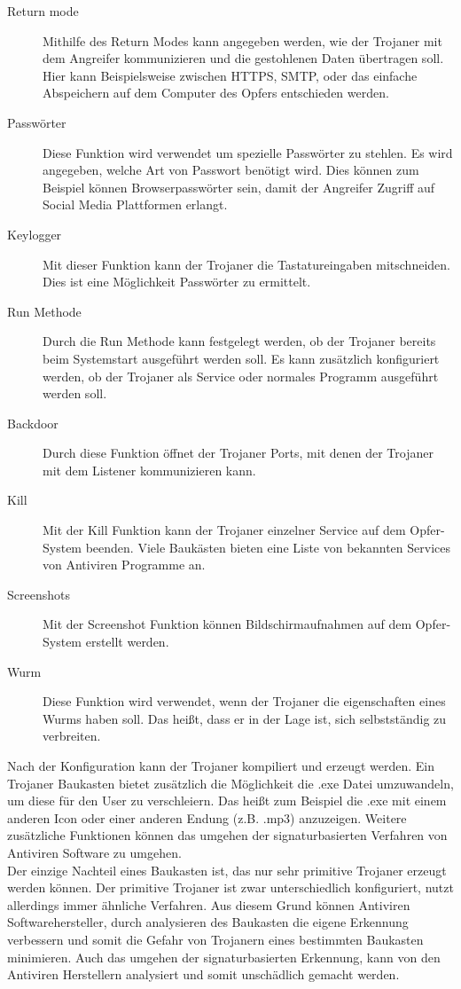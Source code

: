 \begin{description}
\item[Return mode] Mithilfe des Return Modes kann angegeben werden, wie der Trojaner mit dem Angreifer kommunizieren und die gestohlenen Daten übertragen soll. 
        Hier kann Beispielsweise zwischen HTTPS, SMTP, oder das einfache Abspeichern auf dem Computer des Opfers entschieden werden.
\item[Passwörter] Diese Funktion wird verwendet um spezielle Passwörter zu stehlen. Es wird angegeben, welche Art von Passwort benötigt wird. Dies können zum Beispiel können Browserpasswörter sein, damit der Angreifer Zugriff auf Social Media Plattformen erlangt.
\item[Keylogger] Mit dieser Funktion kann der Trojaner die Tastatureingaben mitschneiden. Dies ist eine Möglichkeit Passwörter zu ermittelt.
\item[Run Methode] Durch die Run Methode kann festgelegt werden, ob der Trojaner bereits beim Systemstart ausgeführt werden soll. Es kann zusätzlich konfiguriert werden, ob der Trojaner als Service oder normales Programm ausgeführt werden soll.
\item[Backdoor] Durch diese Funktion öffnet der Trojaner Ports, mit denen der Trojaner mit dem Listener kommunizieren kann.
\item[Kill] Mit der Kill Funktion kann der Trojaner einzelner Service auf dem Opfer-System beenden. Viele Baukästen bieten eine Liste von bekannten Services von Antiviren Programme an.
\item[Screenshots] Mit der Screenshot Funktion können Bildschirmaufnahmen auf dem Opfer-System erstellt werden.
\item[Wurm] Diese Funktion wird verwendet, wenn der Trojaner die eigenschaften eines Wurms haben soll. Das heißt, dass er in der Lage ist, sich selbstständig zu verbreiten.
\end{description}
Nach der Konfiguration kann der Trojaner kompiliert und erzeugt werden. 
Ein Trojaner Baukasten bietet zusätzlich die Möglichkeit die .exe Datei umzuwandeln, um diese für den User zu verschleiern. 
Das heißt zum Beispiel die .exe mit einem anderen Icon oder einer anderen Endung (z.B. .mp3) anzuzeigen. 
Weitere zusätzliche Funktionen können das umgehen der signaturbasierten Verfahren von Antiviren Software zu umgehen.\\
Der einzige Nachteil eines Baukasten ist, das nur sehr primitive Trojaner erzeugt werden können. 
Der primitive Trojaner ist zwar unterschiedlich konfiguriert, nutzt allerdings immer ähnliche Verfahren. 
Aus diesem Grund können Antiviren Softwarehersteller, durch analysieren des Baukasten die eigene Erkennung verbessern und somit die Gefahr von Trojanern eines bestimmten Baukasten minimieren. 
Auch das umgehen der signaturbasierten Erkennung, kann von den Antiviren Herstellern analysiert und somit unschädlich gemacht werden\cite{FOCUS}.

